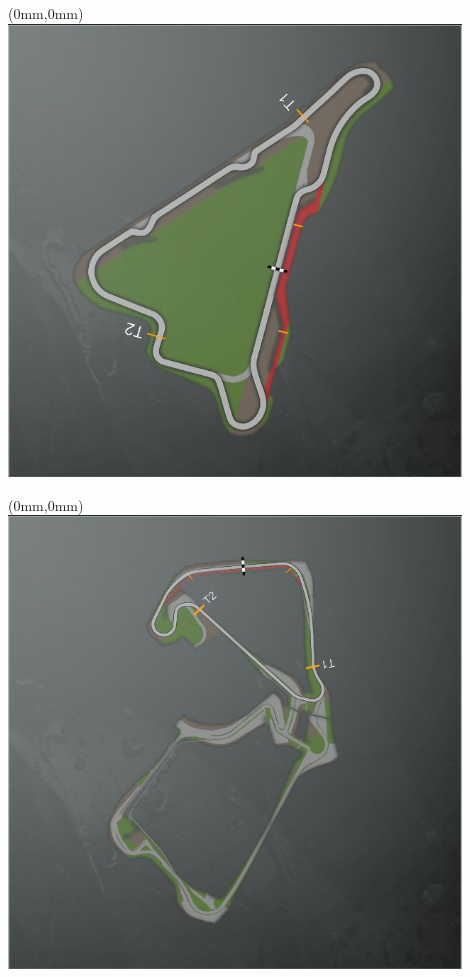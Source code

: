 \null\newpage
\begin{textblock*}{30mm}(0mm,0mm)%
\includegraphics[width=120mm]{TR/2015-05-20_00059.png}
\end{textblock*}
\null\newpage
\begin{textblock*}{30mm}(0mm,0mm)%
\includegraphics[width=120mm]{TR/2015-05-20_00058.png}
\end{textblock*}
